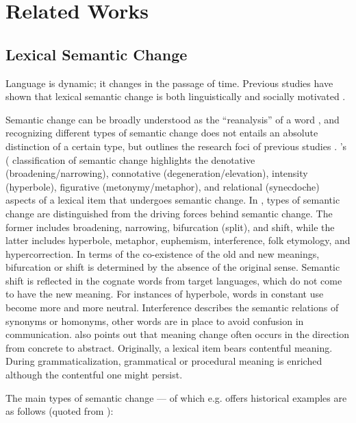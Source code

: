     

\chapter{Related Works}
\label{related_works}

\section{Lexical Semantic Change}
Language is dynamic; it changes in the passage of time. Previous studies have shown that lexical semantic change is both linguistically and socially motivated \parencite{kutuzov2017tracing,kutuzov2018survey,hamilton2016cultural}.

Semantic change can be broadly understood as the ``reanalysis'' of a word \parencite[650]{fortson2017approach}, and recognizing different types of semantic change does not entails an absolute distinction of a certain type, but outlines the research foci of previous studies \parencites[650]{fortson2017approach}{traugott2017semantic}. \citeauthor{bloomfield1933language}'s (\citeyear{bloomfield1933language} classification of semantic change highlights the denotative (broadening/narrowing), connotative (degeneration/elevation), intensity (hyperbole), figurative (metonymy/metaphor), and relational (synecdoche) aspects of a lexical item that undergoes semantic change. In \textcite[199-205]{semanticincrowley2010}, types of semantic change are distinguished from the driving forces behind semantic change. The former includes broadening, narrowing, bifurcation (split), and shift, while the latter includes hyperbole, metaphor, euphemism, interference, folk etymology, and hypercorrection. In terms of the co-existence of the old and new meanings, bifurcation or shift is determined by the absence of the original sense. Semantic shift is reflected in the cognate words from target languages, which do not come to have the new meaning. For instances of hyperbole, words in constant use become more and more neutral. Interference describes the semantic relations of synonyms or homonyms, other words are in place to avoid confusion in communication. \textcite[81]{traugott2001regularity} also points out that meaning change often occurs in the direction from concrete to abstract. Originally, a lexical item bears contentful meaning. During grammaticalization, grammatical or procedural meaning is enriched although the contentful one might persist.

The main types of semantic change — of which e.g. \textcite{traugott2017semantic} offers historical examples are as follows (quoted from \parencite[6]{giulianelli2019lexical}):

